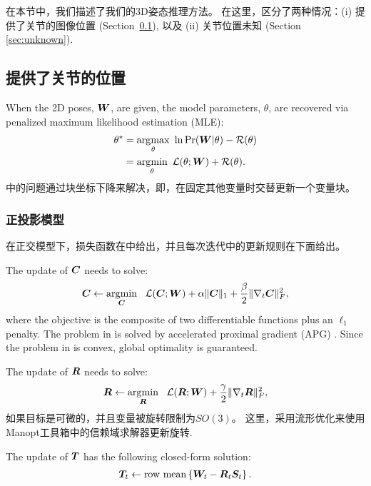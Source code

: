 
在本节中，我们描述了我们的3D姿态推理方法。 在这里，区分了两种情况：(i) 提供了关节的图像位置 (Section\ \ref{sec:known}), 以及
(ii) 关节位置未知 (Section \ref{sec:unknown}).

\subsection{提供了关节的位置}\label{sec:known}

When the 2D poses, ${\bm{W}}$, are given, the model parameters, $\theta$, are recovered via penalized maximum likelihood estimation (MLE):
\begin{align}\label{eq:pmle}
\theta^* &= \operatorname*{arg\!\max}_{\theta} ~ \ln\mbox{Pr}({\bm{W}}|\theta) - \mathcal{R}(\theta) \nonumber \\
& = \operatorname*{arg\!\min}_{\theta} ~ \mathcal{L}(\theta;{\bm{W}}) + \mathcal{R}(\theta).
\end{align}
  中的问题通过块坐标下降来解决，即，在固定其他变量时交替更新一个变量块。

\subsubsection{正投影模型}

在正交模型下，损失函数在中给出，并且每次迭代中的更新规则在下面给出。

The update of ${\bm{C}}$ needs to solve:
\begin{align}\label{eq:C-step}
{\bm{C}} \leftarrow \operatorname*{arg\!\min}_{{\bm{C}}} ~~ \mathcal{L}({\bm{C}};{\bm{W}}) + \alpha\|{\bm{C}}\|_1 + \frac{\beta}{2}\|\nabla_t{\bm{C}}\|_F^2,
\end{align}
where the objective is the composite of two differentiable functions plus an $\ell_1$ penalty. The problem in  is solved by accelerated proximal gradient (APG) \cite{nesterov2007gradient}.
Since the problem in   is convex, global optimality is guaranteed. 

The update of ${\bm{R}}$ needs to solve:
\begin{align}\label{eq:R-step}
{\bm{R}} \leftarrow \operatorname*{arg\!\min}_{{\bm{R}}} ~~ \mathcal{L}({\bm{R}};{\bm{W}}) + \frac{\gamma}{2}\|\nabla_t{\bm{R}}\|_F^2,
\end{align}
如果目标是可微的，并且变量被旋转限制为$SO(3)$。 这里，采用流形优化来使用Manopt工具箱中的信赖域求解器更新旋转\cite{boumal2014manopt}.

The update of ${\bm{T}}$ has the following closed-form solution:
\begin{align}\label{eq:T-step}
{\bm{T}}_t \leftarrow \mbox{row mean}\left\{{\bm{W}}_t - {\bm{R}}_t{\bm{S}}_t\right\}.
\end{align}

